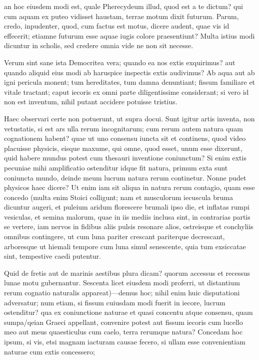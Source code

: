 an hoc eiusdem modi est, quale Pherecydeum illud, quod est a te dictum? qui cum aquam ex puteo vidisset haustam, terrae motum dixit futurum. Parum, credo, inpudenter, quod, cum factus est motus, dicere audent, quae vis id effecerit; etiamne futurum esse aquae iugis colore praesentiunt? Multa istius modi dicuntur in scholis, sed credere omnia vide ne non sit necesse.

 Verum sint sane ista Democritea vera; quando ea nos extis exquirimus? aut quando aliquid eius modi ab haruspice inspectis extis audivimus? Ab aqua aut ab igni pericula monent; tum hereditates, tum damna denuntiant; fissum familiare et vitale tractant; caput iecoris ex omni parte diligentissime considerant; si vero id non est inventum, nihil putant accidere potuisse tristius.

 Haec observari certe non potuerunt, ut supra docui. Sunt igitur artis inventa, non vetustatis, si est ars ulla rerum incognitarum; cum rerum autem natura quam cognationem habent? quae ut uno consensu iuncta sit et continens, quod video placuisse physicis, eisque maxume, qui omne, quod esset, unum esse dixerunt, quid habere mundus potest cum thesauri inventione coniunctum? Si enim extis pecuniae mihi amplificatio ostenditur idque fit natura, primum exta sunt coniuncta mundo, deinde meum lucrum natura rerum continetur. Nonne pudet physicos haec dicere? Ut enim iam sit aliqua in natura rerum contagio, quam esse concedo (multa enim Stoici colligunt; nam et musculorum iecuscula bruma dicuntur augeri, et puleium aridum florescere brumali ipso die, et inflatas rumpi vesiculas, et semina malorum, quae in iis mediis inclusa sint, in contrarias partis se vertere, iam nervos in fidibus aliis pulsis resonare alios, ostreisque et conchyliis omnibus contingere, ut cum luna pariter crescant pariterque decrescant, arboresque ut hiemali tempore cum luna simul senescente, quia tum exsiccatae sint, tempestive caedi putentur.

 Quid de fretis aut de marinis aestibus plura dicam? quorum accessus et recessus lunae motu gubernantur. Sescenta licet eiusdem modi proferri, ut distantium rerum cognatio naturalis appareat)—demus hoc; nihil enim huic disputationi adversatur; num etiam, si fissum cuiusdam modi fuerit in iecore, lucrum ostenditur? qua ex coniunctione naturae et quasi concentu atque consensu, quam sumpa/qeian Graeci appellant, convenire potest aut fissum iecoris cum lucello meo aut meus quaesticulus cum caelo, terra rerumque natura? Concedam hoc ipsum, si vis, etsi magnam iacturam causae fecero, si ullam esse convenientiam naturae cum extis concessero;

